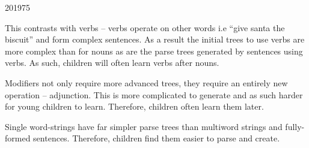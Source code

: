 \documentclass[10pt,\jkfside,a4paper]{article}
\begin{document}
\begin{examquestion}{2019}{7}{5}
\begin{enumerate}[label=(\alph*)]
This contrasts with verbs -- verbs operate on other words i.e ``give santa
the biscuit'' and form complex sentences. As a result the initial trees to
use verbs are more complex than for nouns as are the parse trees generated
by sentences using verbs. As such, children will often learn verbs after nouns.

Modifiers not only require more advanced trees, they require an entirely new
operation -- adjunction. This is more complicated to generate and as such
harder for young children to learn. Therefore, children often learn them later.

Single word-strings have far simpler parse trees than multiword strings and
fully-formed sentences. Therefore, children find them easier to parse and
create.

\end{enumerate}

\end{examquestion}
\end{document}
